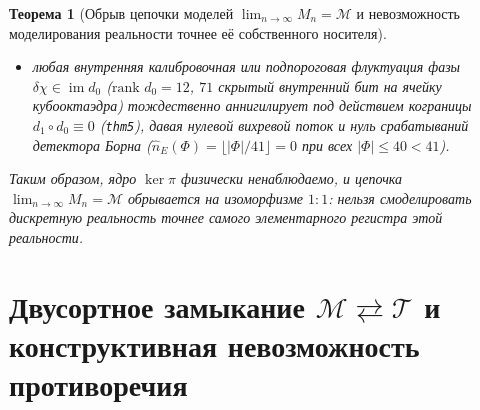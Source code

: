 \documentclass[11pt,a4paper]{article}
\newtheorem{theorem}{Теорема}[section]
\theoremstyle{definition}
\theoremstyle{remark}
\begin{document}
\begin{theorem}[Обрыв цепочки моделей $\lim_{n\to\infty} M_n = \mathcal{M}$ и невозможность моделирования реальности точнее её собственного носителя]
\begin{enumerate}[label=\textbf{(\roman*)},leftmargin=*]
\begin{itemize}[noitemsep]
  \item любая внутренняя калибровочная или подпороговая флуктуация фазы $\delta\chi \in \operatorname{im} d_0$ ($\text{rank } d_0 = 12$, $71$ скрытый внутренний бит на ячейку кубооктаэдра) тождественно аннигилирует под действием кограницы $d_1\circ d_0 \equiv 0$ (\texttt{thm5}), давая нулевой вихревой поток и нуль срабатываний детектора Борна ($\hat{n}_E(\Phi) = \lfloor|\Phi|/41\rfloor = 0$ при всех $|\Phi|\le 40 < 41$).
  \end{itemize}
  Таким образом, ядро $\ker\pi$ физически ненаблюдаемо, и цепочка $\lim_{n\to\infty} M_n = \mathcal{M}$ обрывается на изоморфизме $1:1$: \emph{нельзя смоделировать дискретную реальность точнее самого элементарного регистра этой реальности}.
\end{enumerate}
\end{theorem}

\section{Двусортное замыкание $\mathcal{M} \rightleftarrows \mathcal{T}$ и конструктивная невозможность противоречия}
\label{sec:bilateral-closure}
\end{document}
